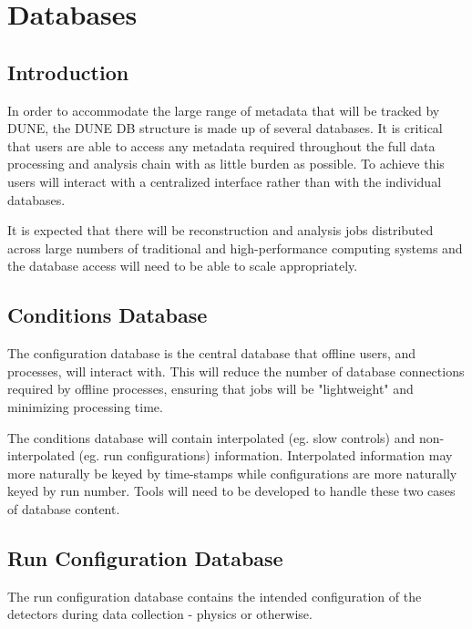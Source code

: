 \chapter{Databases  }
\label{ch:db}

\section{Introduction}
\label{sec:db:intro} 

In order to accommodate the large range of metadata that will be tracked by DUNE, the DUNE DB structure is made up of several databases. It is critical that users are able to access any metadata required throughout the full data processing and analysis chain with as little burden as possible. To achieve this users will interact with a centralized interface rather than with the individual databases. 

It is expected that there will be reconstruction and analysis jobs distributed across large numbers of traditional and high-performance computing systems and the database access will need to be able to scale appropriately.

\section{Conditions Database}
\label{sec:db:conditions} 

The configuration database is the central database that offline users, and processes, will interact with. This will reduce the number of database connections required by offline processes, ensuring that jobs will be "lightweight" and minimizing processing time.

The conditions database will contain interpolated (eg. slow controls) and non-interpolated (eg. run configurations) information. Interpolated information may more naturally be keyed by time-stamps while configurations are more naturally keyed by run number. Tools will need to be developed to handle these two cases of database content. 

\section{Run Configuration Database}
\label{sec:db:config}  

The run configuration database contains the intended configuration of the detectors during data collection - physics or otherwise. 

